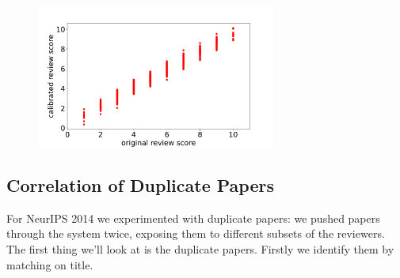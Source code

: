 \begin{figure}[htb]
\includegraphics[width=0.70\textwidth]{diagrams/neurips/calibrated-review-score-vs-original-score.pdf}


\caption{}
\label{}
\end{figure}

\hypertarget{correlation-of-duplicate-papers}{%
\subsection{Correlation of Duplicate
Papers}\label{correlation-of-duplicate-papers}}

\begin{flushright}
\end{flushright}

For NeurIPS 2014 we experimented with duplicate papers: we pushed papers
through the system twice, exposing them to different subsets of the
reviewers. The first thing we'll look at is the duplicate papers.
Firstly we identify them by matching on title.

\begin{Shaded}
\begin{Highlighting}[]
\OperatorTok{=}\OperatorTok{+} 
\OperatorTok{=}\OperatorTok{=}
\OperatorTok{=}\NormalTok{ []}
     \OperatorTok{\textgreater{}}  \OperatorTok{!=} \NormalTok{:}
\OperatorTok{=} \NormalTok{(papers.papers[papers.papers[}\NormalTok{].}\NormalTok{.contains(papers.papers.Title[ID].strip())].index)}
\OperatorTok{=}\NormalTok{)}
\end{Highlighting}
\end{Shaded}

